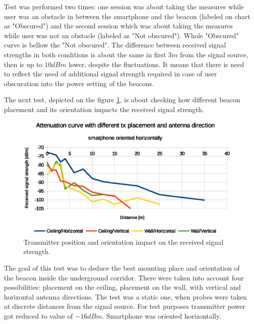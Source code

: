 \documentclass[../main.tex]{subfiles}
\begin{document}
Test was performed two times: one session was about taking the measures while user was an obstacle in between the smartphone and the beacon (labeled on chart as "Obscured") and the second session which was about taking the measures while user was not an obstacle (labeled as "Not obscured"). Whole "Obscured" curve is bellow the "Not obscured". The difference between received signal strengths in both conditions is about the same in first $3m$ from the signal source, then is up to $10 dBm$ lower, despite the fluctuations. It means that there is need to reflect the need of additional signal strength required in case of user obscuration into the power setting of the beacons.

The next test, depicted on the figure \ref{fig:tests_case6_tx_placement_and_direction},  is about checking how different beacon placement and its orientation impacts the received signal strength.

\begin{figure}[ht]
\includegraphics[width=\textwidth, keepaspectratio]{pictures/tests_case6_tx_placement_and_direction}
\centering
\caption{Transmitter position and orientation impact on the received signal strength.}
\label{fig:tests_case6_tx_placement_and_direction}
\end{figure}

The goal of this test was to deduce the best mounting place and orientation of the beacon inside the underground corridor. There were taken into account four possibilities: placement on the ceiling, placement on the wall, with vertical and horizontal antenna directions. The test was a static one, when probes were taken at discrete distances from the signal source. For test purposes transmitter power got reduced to value of $-16dBm$. Smartphone was oriented horizontally.
\end{document}
